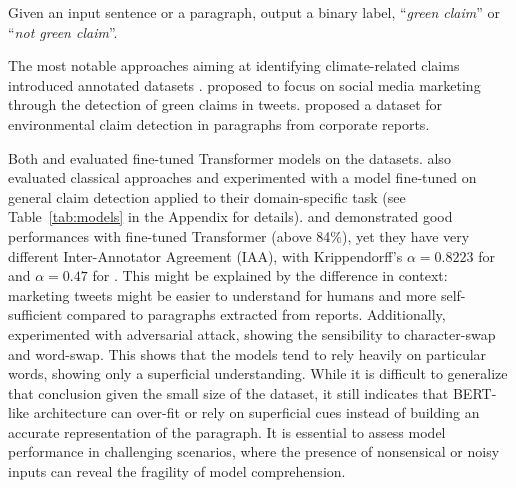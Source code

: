 \task  Given an input sentence or a paragraph, output a binary label, ``\textit{green claim}'' or ``\textit{not green claim}''. 


\datasets The most notable approaches aiming at identifying climate-related claims introduced annotated datasets \cite{vinicius_woloszyn_towards_2021, stammbach_environmental_2023}.
\citet{vinicius_woloszyn_towards_2021} proposed to focus on social media marketing through the detection of green claims in tweets. \citet{stammbach_environmental_2023} proposed a dataset for environmental claim detection in paragraphs from corporate reports.

\solutions Both \citet{stammbach_environmental_2023} and \citet{vinicius_woloszyn_towards_2021} evaluated fine-tuned Transformer models on the datasets. \citet{stammbach_environmental_2023} also evaluated classical approaches and experimented with a model fine-tuned on general claim detection \cite{Arslan_Hassan_Li_Tremayne_2020} applied to their domain-specific task (see Table~\ref{tab:models} in the Appendix for details). 
\citet{vinicius_woloszyn_towards_2021} and \citet{stammbach_environmental_2023} demonstrated good performances with fine-tuned Transformer (above 84\%), yet they have very different Inter-Annotator Agreement (IAA), with Krippendorff's $\alpha=0.8223$ for \citet{vinicius_woloszyn_towards_2021} and $\alpha=0.47$ for \citet{stammbach_environmental_2023}. This might be explained by the difference in context: marketing tweets might be easier to understand for humans and more self-sufficient compared to paragraphs extracted from reports.
Additionally, \citet{vinicius_woloszyn_towards_2021} experimented with adversarial attack, showing the sensibility to character-swap and word-swap. This shows that the models tend to rely heavily on particular words, showing only a superficial understanding. While it is difficult to generalize that conclusion given the small size of the dataset, it still indicates that BERT-like architecture can over-fit or rely on superficial cues instead of building an accurate representation of the paragraph. 
It is essential to assess model performance in challenging scenarios, where the presence of nonsensical or noisy inputs can reveal the fragility of model comprehension.

